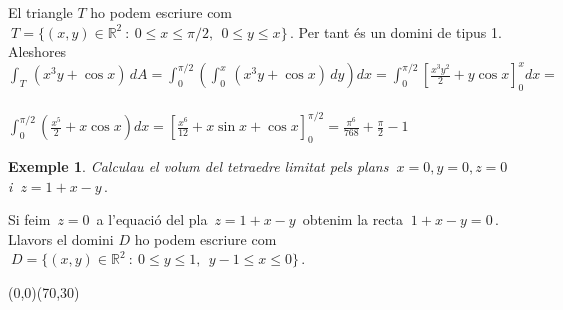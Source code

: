 \documentclass[12pt]{article}
\newtheorem{exemple}{Exemple}[subsection]
\newcommand{\R}{\mathbb{R}}
\begin{document}
\vspace*{1cm}

El triangle $T$ ho podem escriure com $\ T=\{(x,y)\in\R^2\ :\ 0\leq
x\leq \pi/2,\ \ 0\leq y\leq x\}\,.$ Per tant {\'e}s un domini de tipus
1. Aleshores\\

\hspace*{1cm}$\displaystyle\int_T\,(x^3y+\cos x)\,dA=
\int_0^{\pi/2}\left(\int_{0}^{x}\,(x^3y+\cos x)\,
dy\right)dx=\int_0^{\pi/2}\left[\frac{x^3 y^2}{2}+ y\cos
x\right]_0^xdx=$\\\\

\hspace*{1cm}$\displaystyle\int_0^{\pi/2}\left(\frac{x^5}{2}+ x\cos
x\right)dx=\left[\frac{x^6}{12}+ x\sin x+\cos
x\right]_0^{\pi/2}=\frac{\pi^6}{768}+\frac{\pi}{2}-1$\\


\begin{exemple}
Calculau el volum del tetraedre limitat pels plans $\ x=0,y=0,z=0\ $
i $\ z=1+x-y\,.$
\end{exemple}

Si feim $\,z=0\,$ a l'equaci{\'o} del pla $\, z=1+x-y\,$ obtenim la
recta $\ 1+x-y=0\,.$ Llavors el domini $D$ ho podem escriure com $\
D=\{(x,y)\in\R^2\ :\ 0\leq y\leq 1,\ \ y-1\leq x\leq 0\}\,.$

\vspace*{3.5cm}
\begin{center}
\begin{picture}(0,0)(70,30)
\end{picture}
\end{center}
\end{document}

